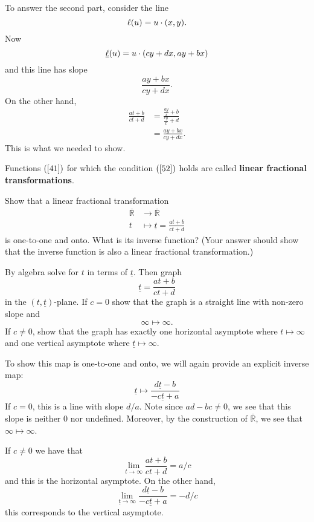 \documentclass{ximera}
\begin{document}
\begin{problem}
\begin{freeResponse}
To answer the second part, consider the line
\[
\ell(u) = u\cdot (x,y).
\]
Now 
\[
\underline{\ell}(u) = u\cdot (cy+dx,ay+bx)
\]
and this line has slope
\[
\frac{ay+bx}{cy+dx}.
\]
On the other hand, 
\begin{align*}
\frac{at+b}{ct+d} &= \frac{\frac{ay}{x} + b}{\frac{cy}{x}+d} \\
&= \frac{ay+bx}{cy+dx}.
\end{align*}
This is what we needed to show.
\end{freeResponse}
\end{problem}




\begin{definition}
Functions $\left( \ref{41}\right) $ for which the condition $\left(
\ref{52}\right)  $ holds are called \textbf{linear fractional transformations}.
\end{definition}


\begin{problem}
Show that a linear fractional transformation%
\begin{align*}
\overline{\mathbb{R}} &\rightarrow\overline{\mathbb{R}}\\
t &\mapsto\underline{t} =\frac{at+b}{ct+d}%
\end{align*}
is one-to-one and onto. What is its inverse function? (Your answer should show that
the inverse function is also a linear fractional transformation.)

\begin{hint}
By algebra solve for $t$ in terms of $\underline{t}$. Then graph%
\[
\underline{t}=\frac{at+b}{ct+d}%
\]
in the $\left(  t,\underline{t}\right)  $-plane. If $c=0$ show that the graph
is a straight line with non-zero slope and%
\[
\infty\mapsto\infty.
\]
If $c\neq0$, show that the graph has exactly one horizontal asymptote where
$t\mapsto\infty$ and one vertical asymptote where $\underline{t}\mapsto\infty$.
\end{hint}
\begin{freeResponse}
To show this map is one-to-one and onto, we will again provide an
explicit inverse map:
\[
\underline{t} \mapsto \frac{d \underline{t}-b}{-c \underline{t} +a}
\]
If $c= 0$, this is a line with slope $d/a$. Note since $ad-bc \ne 0$,
we see that this slope is neither $0$ nor undefined. Moreover, by the construction of $\overline{\mathbb{R}}$, we see that $\infty\mapsto\infty$.

If $c\ne0$ we have that
\[
\lim_{t\to \infty} \frac{at+b}{ct+d}  = a/c
\]
and this is the horizontal asymptote. On the other hand, 
\[
\lim_{\underline{t}\to\infty} \frac{d \underline{t}-b}{-c \underline{t} +a} = -d/c
\]
this corresponds to the vertical asymptote. 
\end{freeResponse}
\end{problem}
\end{document}
